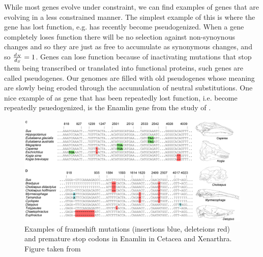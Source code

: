 While most genes evolve under constraint, we can find examples of
genes that are evolving in a less constrained manner. The simplest
example of this is where the gene has lost function, e.g. has recently
become pseudogenized. When a gene completely loses function there will be no
selection against non-synoynous changes and so they are just as free
to accumulate as synonymous changes, and so $\frac{d_N}{d_S}=1$.
Genes can lose function because of inactivating mutations that stop
them being transcribed or translated into functional proteins, such genes are
called pseudogenes. Our genomes are filled with old pseudogenes whose
meaning are slowly being eroded through the accumulation of neutral substitutions.
One nice example of as gene that has been repeatedly lost function,
i.e. become repeatedly psuedogenized, is
the Enamlin gene from the study of \citeauthor{Meredith:09}.

\begin{figure}
\begin{center}
\includegraphics[width=\textwidth]{Journal_figs/genetic_drift/Enamelin/Enamlin.pdf}
\end{center}
\caption{Examples of frameshift mutations (insertions blue, deleteions
  red) and premature stop codons in Enamlin in Cetacea and
  Xenarthra. Figure taken from \citeauthor{Meredith:09}} \label{fig:Enamlin_coding}  
\end{figure} 


